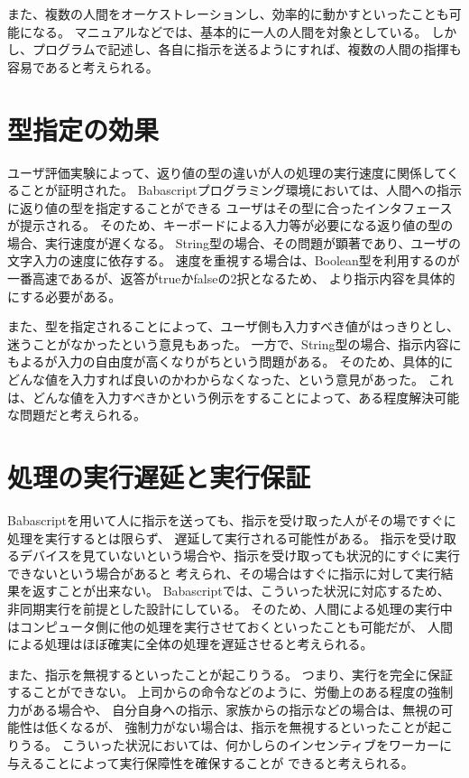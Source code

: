 また、複数の人間をオーケストレーションし、効率的に動かすといったことも可能になる。
マニュアルなどでは、基本的に一人の人間を対象としている。
しかし、プログラムで記述し、各自に指示を送るようにすれば、複数の人間の指揮も容易であると考えられる。

\section{型指定の効果}\label{ux578bux6307ux5b9aux306eux52b9ux679c}

ユーザ評価実験によって、返り値の型の違いが人の処理の実行速度に関係してくることが証明された。
Babascriptプログラミング環境においては、人間への指示に返り値の型を指定することができる
ユーザはその型に合ったインタフェースが提示される。
そのため、キーボードによる入力等が必要になる返り値の型の場合、実行速度が遅くなる。
String型の場合、その問題が顕著であり、ユーザの文字入力の速度に依存する。
速度を重視する場合は、Boolean型を利用するのが一番高速であるが、返答がtrueかfalseの2択となるため、
より指示内容を具体的にする必要がある。

また、型を指定されることによって、ユーザ側も入力すべき値がはっきりとし、迷うことがなかったという意見もあった。
一方で、String型の場合、指示内容にもよるが入力の自由度が高くなりがちという問題がある。
そのため、具体的にどんな値を入力すれば良いのかわからなくなった、という意見があった。
これは、どんな値を入力すべきかという例示をすることによって、ある程度解決可能な問題だと考えられる。

\section{処理の実行遅延と実行保証}\label{ux51e6ux7406ux306eux5b9fux884cux9045ux5ef6ux3068ux5b9fux884cux4fddux8a3c}

Babascriptを用いて人に指示を送っても、指示を受け取った人がその場ですぐに処理を実行するとは限らず、
遅延して実行される可能性がある。
指示を受け取るデバイスを見ていないという場合や、指示を受け取っても状況的にすぐに実行できないという場合があると
考えられ、その場合はすぐに指示に対して実行結果を返すことが出来ない。
Babascriptでは、こういった状況に対応するため、非同期実行を前提とした設計にしている。
そのため、人間による処理の実行中はコンピュータ側に他の処理を実行させておくといったことも可能だが、
人間による処理はほぼ確実に全体の処理を遅延させると考えられる。

また、指示を無視するといったことが起こりうる。
つまり、実行を完全に保証することができない。
上司からの命令などのように、労働上のある程度の強制力がある場合や、
自分自身への指示、家族からの指示などの場合は、無視の可能性は低くなるが、
強制力がない場合は、指示を無視するといったことが起こりうる。
こういった状況においては、何かしらのインセンティブをワーカーに与えることによって実行保障性を確保することが
できると考えられる。

